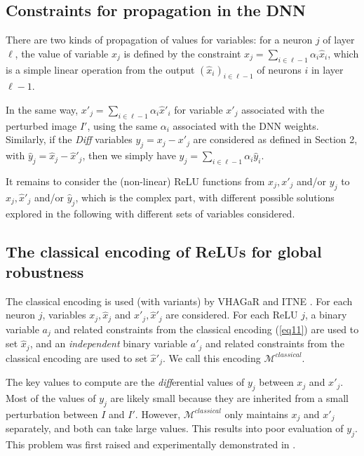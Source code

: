 \subsection{Constraints for propagation in the DNN}


There are two kinds of propagation of values for variables: 
for a neuron $j$ of layer $\ell$, the value of variable $x_j$ is defined by the constraint $x_j = \sum_{i \in \ell-1} \alpha_i \hat{x}_i$, which is a simple linear operation from the output $(\hat{x}_i)_{i \in \ell-1}$ of neurons $i$ in layer $\ell-1$.

In the same way, $x'_j = \sum_{i \in \ell-1} \alpha_i \hat{x}'_i$ 
for variable $x'_j$ associated with the perturbed image $I'$, using the same $\alpha_i$ associated with the DNN weights. Similarly, 
if the {\em Diff} variables $y_j = x_j - x'_j$ are considered as defined in Section 2, with $\hat{y}_j = \hat{x}_j - \hat{x}'_j$, then we simply have 
$y_j = \sum_{i \in \ell-1} \alpha_i \hat{y}_i$.

It remains to consider the (non-linear) ReLU functions from $x_j,x'_j$ and/or $y_j$ to $\hat{x}_j,\hat{x}'_j$ and/or $\hat{y}_j$, which is the complex part, with different possible solutions explored in the following with different sets of variables considered. 





	
\subsection{The classical encoding of ReLUs for global robustness}
	
    The classical encoding is used (with variants) by VHAGaR \cite{vhagar} and ITNE \cite{ITNE}. For each neuron $j$, variables $x_j,\hat{x}_j$ and $x'_j,\hat{x}'_j$ are considered. For each ReLU $j$, a binary variable $a_j$ and related constraints from the classical encoding (\ref{eq11}) \cite{MILP} are used to set $\hat{x}_j$, and an {\em independent} binary variable $a'_j$ and related constraints from the classical encoding are used to set $\hat{x}'_j$. We call this encoding $\mathcal{M}^{classical}$.
	
	The key values to compute are the {\em diff}erential values of $y_j$ between $x_j$ and $x'_j$. Most of the values of $y_j$ are likely small because they are inherited from a small perturbation between $I$ and $I'$.
	However, $\mathcal{M}^{classical}$ only maintains $x_j$ and $x'_j$ separately, and both can take large values. This results into poor evaluation of $y_j$. This problem was first raised and experimentally demonstrated in \cite{diff}.

